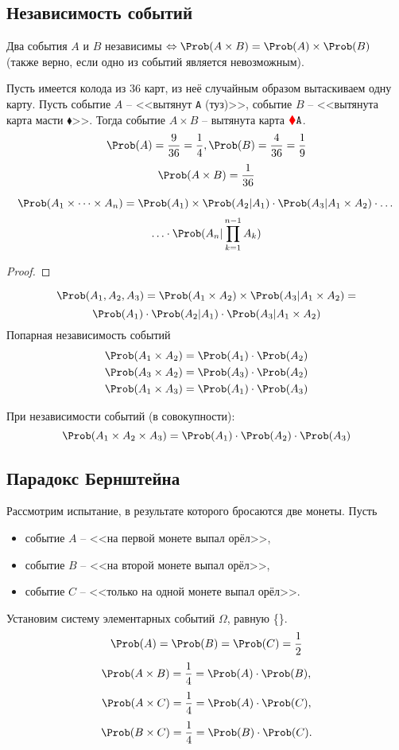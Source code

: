 \subsection{Независимость событий}
\begin{definition}
  Два события $A$ и $B$ независимы $\Leftrightarrow \Prob(A \times B) = \Prob(A) \times \Prob(B)$ (также верно, если одно из событий является невозможным).
\end{definition}
\begin{example}
  Пусть имеется колода из 36 карт, из неё случайным образом вытаскиваем одну карту. Пусть событие $A$ -- <<вытянут \texttt{A} (туз)>>, событие $B$ -- <<вытянута карта масти {\color{red} $\blacklozenge$}>>. Тогда событие $A \times B$ -- вытянута карта ${\color{red} \blacklozenge} \texttt{A}$.
  \[
    \Prob(A) = \frac{9}{36} = \frac{1}{4}, \Prob(B) = \frac{4}{36} = \frac{1}{9}
  \]
  \[
    \Prob(A \times B) = \frac{1}{36}
  \]
\end{example}
\[
  \Prob(A_1 \times \dots \times A_n) = \Prob(A_1) \times \Prob(A_2|A_1) \cdot \Prob(A_3|A_1 \times A_2) \cdot \dots
\]
\[
  \ldots \cdot \Prob(A_n | \prod\limits_{k = 1}^{n-1} A_k)
\]
\begin{proof}

\end{proof}
\[
\Prob(A_1, A_2, A_3) = \Prob(A_1 \times A_2) \times \Prob(A_3 | A_1 \times A_2) =
\]
\[
\Prob(A_1) \cdot \Prob(A_2 | A_1) \cdot \Prob(A_3 | A_1 \times A_2)
\]
Попарная независимость событий
\begin{equation}\label{3}
\begin{split}
\Prob(A_1 \times A_2) = \Prob(A_1) \cdot \Prob(A_2) \\
\Prob(A_3 \times A_2) = \Prob(A_3) \cdot \Prob(A_2) \\
\Prob(A_1 \times A_3) = \Prob(A_1) \cdot \Prob(A_3) \\
\end{split}
\end{equation}

При независимости событий (в совокупности):
\begin{equation}\label{4}
  \Prob(A_1 \times A_2 \times A_3) = \Prob(A_1) \cdot \Prob(A_2) \cdot \Prob(A_3)
\end{equation}
\subsection{Парадокс Бернштейна}
Рассмотрим испытание, в результате которого бросаются две монеты. Пусть
\begin{itemize}
  \item событие $A$ -- <<на первой монете выпал орёл>>,
  \item событие $B$ -- <<на второй монете выпал орёл>>,
  \item событие $C$ -- <<только на одной монете выпал орёл>>.
\end{itemize}
Установим систему элементарных событий $\Omega$, равную \{\}.
\[
\Prob(A) = \Prob(B) = \Prob(C) = \frac{1}{2}
\]
\[ \Prob(A \times B) = \frac{1}{4} = \Prob(A) \cdot \Prob(B), \]
\[ \Prob(A \times C) = \frac{1}{4} = \Prob(A) \cdot \Prob(C), \]
\[ \Prob(B \times C) = \frac{1}{4} = \Prob(B) \cdot \Prob(C). \]

